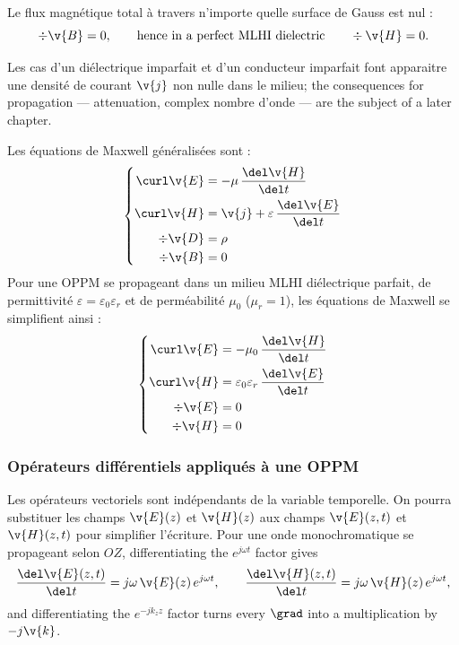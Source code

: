 \begin{definition}
  Le flux magnétique total à travers n'importe quelle surface de Gauss est nul :
  \[
    \div \v{B} = 0,
    \qquad\text{hence in a perfect MLHI dielectric}\qquad
    \div \v{H} = 0.
  \]
\end{definition}

\begin{remark}
  Les cas d'un diélectrique imparfait et d'un conducteur imparfait font
  apparaitre une densité de courant $\v{j}$ non nulle dans le milieu; the
  consequences for propagation --- attenuation, complex nombre d'onde --- are
  the subject of a later chapter.
\end{remark}

\begin{conclusion}
  Les équations de Maxwell généralisées sont :
  \[
    \left\{
      \begin{aligned}
        \curl \v{E} &= -\mu\,\frac{\del \v{H}}{\del t} \\
        \curl \v{H} &= \v{j} + \varepsilon\,\frac{\del \v{E}}{\del t} \\
        \div \v{D}  &= \rho \\
        \div \v{B}  &= 0
      \end{aligned}
    \right.
  \]
  Pour une OPPM se propageant dans un milieu MLHI diélectrique parfait, de
  permittivité $\varepsilon = \varepsilon_0\varepsilon_r$ et de perméabilité
  $\mu_0$ ($\mu_r = 1$), les équations de Maxwell se simplifient ainsi :
  \[
    \left\{
      \begin{aligned}
        \curl \v{E} &= -\mu_0\,\frac{\del \v{H}}{\del t} \\
        \curl \v{H} &= \varepsilon_0\varepsilon_r\,\frac{\del \v{E}}{\del t} \\
        \div \v{E}  &= 0 \\
        \div \v{H}  &= 0
      \end{aligned}
    \right.
  \]
\end{conclusion}

\subsubsection{Opérateurs différentiels appliqués à une OPPM}

Les opérateurs vectoriels sont indépendants de la variable temporelle. On
pourra substituer les champs $\v{E}(z)$ et $\v{H}(z)$ aux champs $\v{E}(z,t)$ et
$\v{H}(z,t)$ pour simplifier l'écriture. Pour une onde monochromatique se
propageant selon $OZ$, differentiating the $e^{j\omega t}$ factor gives
\[
  \frac{\del \v{E}(z,t)}{\del t} = j\omega\,\v{E}(z)\,e^{j\omega t},
  \qquad
  \frac{\del \v{H}(z,t)}{\del t} = j\omega\,\v{H}(z)\,e^{j\omega t},
\]
and differentiating the $e^{-jk_z z}$ factor turns every $\grad$ into a
multiplication by $-j\v{k}$.

